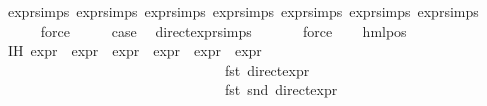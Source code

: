 \begin{isabellebody}
\ expr{\isachardot}{\kern0pt}simps\ expr{\isacharunderscore}{\kern0pt}{}{\isachardot}{\kern0pt}simps{\isacharparenleft}{\kern0pt}{}{\isacharparenright}{\kern0pt}\ expr{\isacharunderscore}{\kern0pt}{}{\isachardot}{\kern0pt}simps{\isacharparenleft}{\kern0pt}{}{\isacharparenright}{\kern0pt}\ expr{\isacharunderscore}{\kern0pt}{}{\isachardot}{\kern0pt}simps{\isacharparenleft}{\kern0pt}{}{\isacharparenright}{\kern0pt}\ expr{\isacharunderscore}{\kern0pt}{}{\isachardot}{\kern0pt}simps{\isacharparenleft}{\kern0pt}{}{\isacharparenright}{\kern0pt}\ expr{\isacharunderscore}{\kern0pt}{}{\isachardot}{\kern0pt}simps{\isacharparenleft}{\kern0pt}{}{\isacharparenright}{\kern0pt}\ expr{\isacharunderscore}{\kern0pt}{}{\isachardot}{\kern0pt}simps{\isacharparenleft}{\kern0pt}{}{\isacharparenright}{\kern0pt}\isanewline
\ \ \ \ \isamarkupfalse%
\ force\isanewline
\ \ \isamarkupfalse%
\ \isamarkupfalse%
\ {\isacharquery}{\kern0pt}case\ \isamarkupfalse%
\ direct{\isacharunderscore}{\kern0pt}expr{\isachardot}{\kern0pt}simps{\isacharparenleft}{\kern0pt}{}{\isacharparenright}{\kern0pt}\ \isanewline
\ \ \ \ \isamarkupfalse%
\ force\isanewline
{}\isamarkupfalse%
\isanewline
\ \ \isamarkupfalse%
\ {\isacharparenleft}{\kern0pt}hml{\isacharunderscore}{\kern0pt}pos\ {\isasymalpha}\ {\isasymphi}{\isacharparenright}{\kern0pt}\isanewline
\ \ \isamarkupfalse%
\ IH{\isacharcolon}{\kern0pt}\ {\isachardoublequoteopen}{\isacharparenleft}{\kern0pt}expr{\isacharunderscore}{\kern0pt}{}\ {\isasymphi}{\isacharcomma}{\kern0pt}\ expr{\isacharunderscore}{\kern0pt}{}\ {\isasymphi}{\isacharcomma}{\kern0pt}\ expr{\isacharunderscore}{\kern0pt}{}\ {\isasymphi}{\isacharcomma}{\kern0pt}\ expr{\isacharunderscore}{\kern0pt}{}\ {\isasymphi}{\isacharcomma}{\kern0pt}\ expr{\isacharunderscore}{\kern0pt}{}\ {\isasymphi}{\isacharcomma}{\kern0pt}\ expr{\isacharunderscore}{\kern0pt}{}\ {\isasymphi}{\isacharparenright}{\kern0pt}\ {\isacharequal}{\kern0pt}\isanewline
\ \ \ \ \ \ \ \ \ \ \ \ \ \ \ \ \ \ \ \ \ \ \ \ \ \ \ \ \ \ \ \ {\isacharparenleft}{\kern0pt}fst\ {\isacharparenleft}{\kern0pt}direct{\isacharunderscore}{\kern0pt}expr\ {\isasymphi}{\isacharparenright}{\kern0pt}{\isacharcomma}{\kern0pt}\ \isanewline
\ \ \ \ \ \ \ \ \ \ \ \ \ \ \ \ \ \ \ \ \ \ \ \ \ \ \ \ \ \ \ \ fst\ {\isacharparenleft}{\kern0pt}snd\ {\isacharparenleft}{\kern0pt}direct{\isacharunderscore}{\kern0pt}expr\ {\isasymphi}{\isacharparenright}{\kern0pt}{\isacharparenright}{\kern0pt}{\isacharcomma}{\kern0pt}\ \isanewline

\end{isabellebody}
